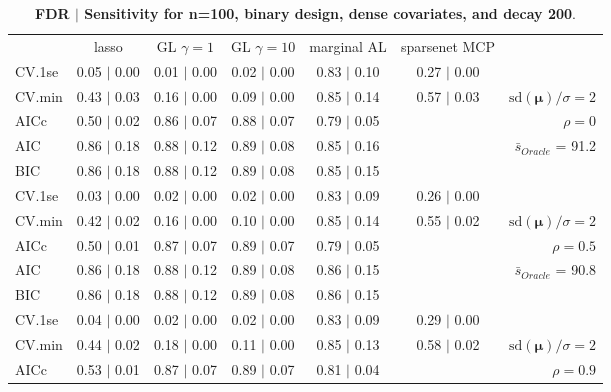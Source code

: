 \clearpage
\begin{table}\vspace{-.5cm}
\caption[l]{ {\it }
{ \bf FDR $\boldsymbol{\mid}$ Sensitivity for n=100, binary design, dense covariates, and  decay  200}.}
\vspace{-.5cm}
\footnotesize{}
\begin{center}
\begin{tabular}{l*{5}{c}|r}
 & lasso & GL $\gamma=1$ & GL $\gamma=10$ & marginal AL & sparsenet MCP  & \\
 \cline{1-7}
CV.1se & 0.05 $\mid$ 0.00 & 0.01 $\mid$ 0.00 & 0.02 $\mid$ 0.00 & 0.83 $\mid$ 0.10 & 0.27 $\mid$ 0.00 & \\
CV.min & 0.43 $\mid$ 0.03 & 0.16 $\mid$ 0.00 & 0.09 $\mid$ 0.00 & 0.85 $\mid$ 0.14 & 0.57 $\mid$ 0.03 &  $\mathrm{sd}(\mathbf{\mu})/\sigma=2$ \\
AICc & 0.50 $\mid$ 0.02 & 0.86 $\mid$ 0.07 & 0.88 $\mid$ 0.07 & 0.79 $\mid$ 0.05 & & $\rho=0$ \\
AIC & 0.86 $\mid$ 0.18 & 0.88 $\mid$ 0.12 & 0.89 $\mid$ 0.08 & 0.85 $\mid$ 0.16 & &  \multirow{2}{*}{$\bar{s}_{Oracle}$ = 91.2} \\
BIC & 0.86 $\mid$ 0.18 & 0.88 $\mid$ 0.12 & 0.89 $\mid$ 0.08 & 0.85 $\mid$ 0.15 & &  \\
 \hline 
CV.1se & 0.03 $\mid$ 0.00 & 0.02 $\mid$ 0.00 & 0.02 $\mid$ 0.00 & 0.83 $\mid$ 0.09 & 0.26 $\mid$ 0.00 & \\
CV.min & 0.42 $\mid$ 0.02 & 0.16 $\mid$ 0.00 & 0.10 $\mid$ 0.00 & 0.85 $\mid$ 0.14 & 0.55 $\mid$ 0.02 &  $\mathrm{sd}(\mathbf{\mu})/\sigma=2$ \\
AICc & 0.50 $\mid$ 0.01 & 0.87 $\mid$ 0.07 & 0.89 $\mid$ 0.07 & 0.79 $\mid$ 0.05 & & $\rho=0.5$ \\
AIC & 0.86 $\mid$ 0.18 & 0.88 $\mid$ 0.12 & 0.89 $\mid$ 0.08 & 0.86 $\mid$ 0.15 & &  \multirow{2}{*}{$\bar{s}_{Oracle}$ = 90.8} \\
BIC & 0.86 $\mid$ 0.18 & 0.88 $\mid$ 0.12 & 0.89 $\mid$ 0.08 & 0.86 $\mid$ 0.15 & &  \\
 \hline 
CV.1se & 0.04 $\mid$ 0.00 & 0.02 $\mid$ 0.00 & 0.02 $\mid$ 0.00 & 0.83 $\mid$ 0.09 & 0.29 $\mid$ 0.00 & \\
CV.min & 0.44 $\mid$ 0.02 & 0.18 $\mid$ 0.00 & 0.11 $\mid$ 0.00 & 0.85 $\mid$ 0.13 & 0.58 $\mid$ 0.02 &  $\mathrm{sd}(\mathbf{\mu})/\sigma=2$ \\
AICc & 0.53 $\mid$ 0.01 & 0.87 $\mid$ 0.07 & 0.89 $\mid$ 0.07 & 0.81 $\mid$ 0.04 & & $\rho=0.9$ \\

\end{tabular}
\end{center}
\end{table}
